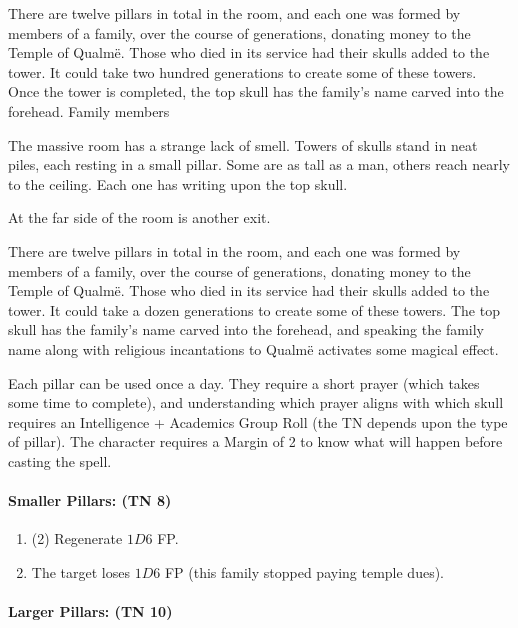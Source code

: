 \begin{multicols}{2}
There are twelve pillars in total in the room, and each one was formed by members of a family, over the course of generations, donating money to the Temple of Qualm\"{e}.  Those who died in its service had their skulls added to the tower.  It could take two hundred generations to create some of these towers.  Once the tower is completed, the top skull has the family's name carved into the forehead.  Family members

\begin{boxtext}

  The massive room has a strange lack of smell.  Towers of skulls stand in neat piles, each resting in a small pillar.  Some are as tall as a man, others reach nearly to the ceiling.  Each one has writing upon the top skull.

  At the far side of the room is another exit.

\end{boxtext}

There are twelve pillars in total in the room, and each one was formed by members of a family, over the course of generations, donating money to the Temple of Qualm\"{e}.
Those who died in its service had their skulls added to the tower.
It could take a dozen generations to create some of these towers.
The top skull has the family's name carved into the forehead, and speaking the family name along with religious incantations to Qualm\"{e} activates some magical effect.

Each pillar can be used once a day.
They require a short prayer (which takes some time to complete), and understanding which prayer aligns with which skull requires an Intelligence + Academics Group Roll (the TN depends upon the type of pillar).
The character requires a Margin of 2 to know what will happen before casting the spell.

\paragraph{Smaller Pillars: (TN 8)}

\begin{enumerate}

  \item{(2) Regenerate $1D6$ FP.}
  \item{The target loses $1D6$ FP (this family stopped paying temple dues).}
\end{enumerate}

\paragraph{Larger Pillars: (TN 10)}


\end{multicols}
